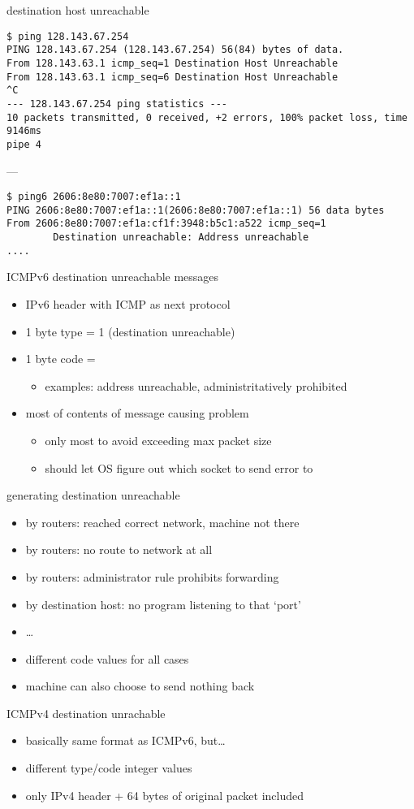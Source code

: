 \begin{frame}[fragile]{destination host unreachable}
\begin{Verbatim}[fontsize=\small]
$ ping 128.143.67.254
PING 128.143.67.254 (128.143.67.254) 56(84) bytes of data.
From 128.143.63.1 icmp_seq=1 Destination Host Unreachable
From 128.143.63.1 icmp_seq=6 Destination Host Unreachable
^C
--- 128.143.67.254 ping statistics ---
10 packets transmitted, 0 received, +2 errors, 100% packet loss, time 9146ms
pipe 4
\end{Verbatim}
---
\begin{Verbatim}[fontsize=\small]
$ ping6 2606:8e80:7007:ef1a::1
PING 2606:8e80:7007:ef1a::1(2606:8e80:7007:ef1a::1) 56 data bytes
From 2606:8e80:7007:ef1a:cf1f:3948:b5c1:a522 icmp_seq=1
        Destination unreachable: Address unreachable
....
\end{Verbatim}
\end{frame}

\begin{frame}{ICMPv6 destination unreachable messages}
\begin{itemize}
\item IPv6 header with ICMP as next protocol
\item 1 byte type = 1 (destination unreachable)
\item 1 byte code =
    \begin{itemize}
    \item examples: address unreachable, administritatively prohibited
    \end{itemize}
\item most of contents of message causing problem
    \begin{itemize}
    \item only most to avoid exceeding max packet size
    \item should let OS figure out which socket to send error to
    \end{itemize}
\end{itemize}
\end{frame}

\begin{frame}{generating destination unreachable}
    \begin{itemize}
    \item by routers: reached correct network, machine not there
    \item by routers: no route to network at all
    \item by routers: administrator rule prohibits forwarding
    \item by destination host: no program listening to that `port'
    \item \ldots
    \vspace{.5cm}
    \item different code values for all cases
    \item machine can also choose to send nothing back
    \end{itemize}
\end{frame}

\begin{frame}{ICMPv4 destination unrachable}
\begin{itemize}
\item basically same format as ICMPv6, but\ldots
\item different type/code integer values
\item only IPv4 header + 64 bytes of original packet included
\end{itemize}
\end{frame}
